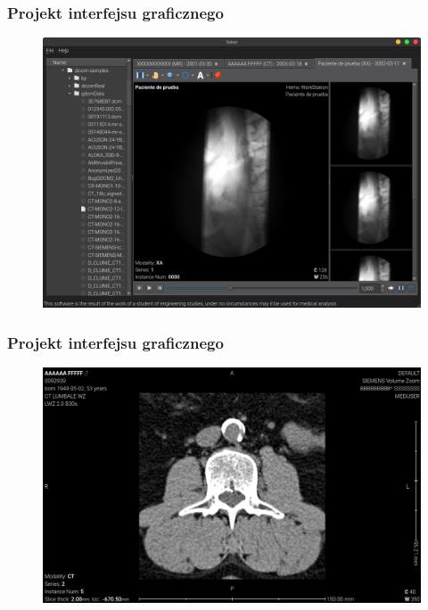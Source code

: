 \documentclass[aspectratio=169]{beamer}
\begin{document}
\begin{frame}
    \frametitle{Projekt interfejsu graficznego}
    \begin{figure}
        \includegraphics[height=0.8\textheight]{img/sokar-gui-002.png}
    \end{figure}
\end{frame}

\begin{frame}
    \frametitle{Projekt interfejsu graficznego}
    \begin{figure}
        \includegraphics[height=0.8\textheight]{img/sokar-gui-003.png}
    \end{figure}
\end{frame}
\end{document}
